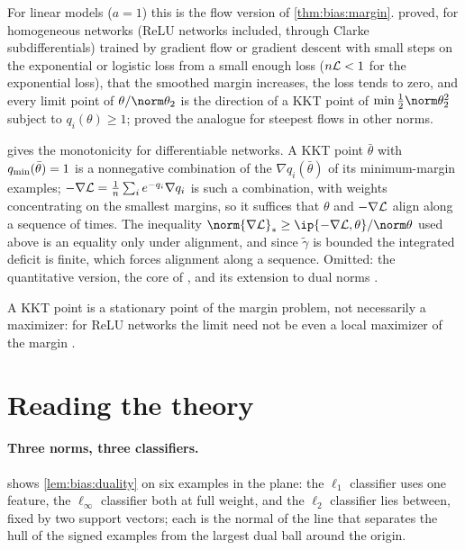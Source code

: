 \begin{refsection}
For linear models ($a=1$) this is the flow version of \cref{thm:bias:margin}. \Textcite{LyuLi2020} proved, for homogeneous networks (ReLU networks included, through Clarke subdifferentials) trained by gradient flow or gradient descent with small steps on the exponential or logistic loss from a small enough loss ($n\mathcal{L}<1$ for the exponential loss), that the smoothed margin increases, the loss tends to zero, and every limit point of $\theta/\norm\theta_2$ is the direction of a KKT point of $\min\frac12\norm\theta_2^2$ subject to $q_i(\theta)\ge1$; \textcite{TsilivisVardiKempe2025} proved the analogue for steepest flows in other norms.

\begin{proofsketch}
 gives the monotonicity for differentiable networks. A KKT point $\bar\theta$ with $q_{\min}(\bar\theta)=1$ is a nonnegative combination of the $\nabla q_i(\bar\theta)$ of its minimum-margin examples; $-\nabla\mathcal{L}=\frac1n\sum_ie^{-q_i}\nabla q_i$ is such a combination, with weights concentrating on the smallest margins, so it suffices that $\theta$ and $-\nabla\mathcal{L}$ align along a sequence of times. The inequality $\norm{\nabla\Loss}_*\ge\ip{-\nabla\Loss,\theta}/\norm\theta$ used above is an equality only under alignment, and since $\tilde\gamma$ is bounded the integrated deficit is finite, which forces alignment along a sequence. Omitted: the quantitative version, the core of \textcite{LyuLi2020}, and its extension to dual norms \parencite{TsilivisVardiKempe2025}.
\end{proofsketch}

A KKT point is a stationary point of the margin problem, not necessarily a maximizer: for ReLU networks the limit need not be even a local maximizer of the margin \parencite{VardiShamirSrebro2022}.

\section{Reading the theory}\label{sec:bias:reading}

\paragraph{Three norms, three classifiers.}  shows \cref{lem:bias:duality} on six examples in the plane: the $\ell_1$ classifier uses one feature, the $\ell_\infty$ classifier both at full weight, and the $\ell_2$ classifier lies between, fixed by two support vectors; each is the normal of the line that separates the hull of the signed examples from the largest dual ball around the origin.


\end{refsection}
